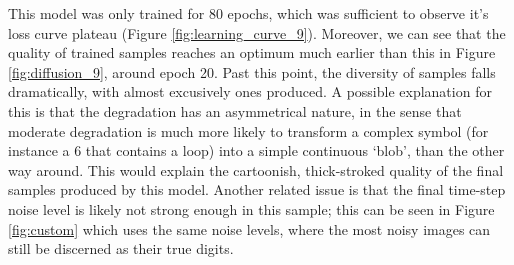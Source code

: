 \documentclass[12pt]{article}
\begin{document}
This model was only trained for 80 epochs, which was sufficient to observe it's loss curve plateau (Figure \ref{fig:learning_curve_9}).
Moreover, we can see that the quality of trained samples reaches an optimum much earlier than this in Figure \ref{fig:diffusion_9}, around epoch 20.
Past this point, the diversity of samples falls dramatically, with almost excusively ones produced.
A possible explanation for this is that the degradation has an asymmetrical nature,
in the sense that moderate degradation is much more likely to transform a complex symbol (for instance a 6 that contains a loop) into a simple continuous `blob',
than the other way around.
This would explain the cartoonish, thick-stroked quality of the final samples produced by this model.
Another related issue is that the final time-step noise level is likely not strong enough in this sample;
this can be seen in Figure \ref{fig:custom} which uses the same noise levels, where the most noisy images can still be discerned as their true digits.
\end{document}
